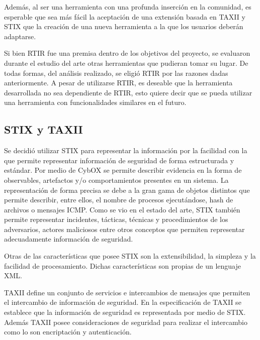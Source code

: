 \bigskip

	Además, al ser una herramienta con una profunda inserción en la comunidad, es esperable que sea más fácil la aceptación
	de una extensión basada en TAXII y STIX que la creación de una nueva herramienta a la que los usuarios deberán
	adaptarse.


\bigskip

	Si bien RTIR fue una premisa dentro de los objetivos del proyecto, se evaluaron durante el estudio del arte otras
	herramientas que pudieran tomar su lugar. De todas formas, del análisis realizado, se eligió RTIR por las razones dadas
	anteriormente. A pesar de utilizarse RTIR, es deseable que la herramienta desarrollada no sea dependiente de RTIR, esto
	quiere decir que se pueda utilizar una herramienta con funcionalidades similares en el futuro.

\subsection{STIX y TAXII}

\bigskip

	Se decidió utilizar STIX para representar la información por la facilidad con la que permite representar información de
	seguridad de forma estructurada y estándar. Por medio de CybOX se permite describir evidencia en la forma de
	observables, artefactos y/o comportamientos presentes en un sistema. La representación de forma precisa se debe a la
	gran gama de objetos distintos que permite describir, entre ellos, el nombre de procesos ejecutándose, hash de archivos
	o mensajes ICMP. Como se vio en el estado del arte, STIX también permite representar incidentes, tácticas, técnicas y
	procedimientos de los adversarios, actores maliciosos entre otros conceptos que permiten representar adecuadamente
	información de seguridad.


\bigskip

	Otras de las características que posee STIX son la extensibilidad, la simpleza y la facilidad de procesamiento. Dichas
	características son propias de un lenguaje XML.


\bigskip

	TAXII define un conjunto de servicios e intercambios de mensajes que permiten el intercambio de información de
	seguridad. En la especificación de TAXII se establece que la información de seguridad es representada por medio de
	STIX. Además TAXII posee consideraciones de seguridad para realizar el intercambio como lo son encriptación y
	autenticación.


